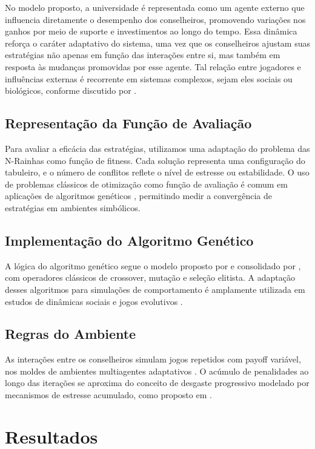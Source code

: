 \documentclass[
	article,			%
	11pt,				%
	oneside,			%
	a4paper,			%
	english,			%
	brazil,				%
	sumario=tradicional
	]{abntex2}
\begin{document}
No modelo proposto, a universidade é representada como um agente externo que influencia diretamente o desempenho dos conselheiros, promovendo variações nos ganhos por meio de suporte e investimentos ao longo do tempo. Essa dinâmica reforça o caráter adaptativo do sistema, uma vez que os conselheiros ajustam suas estratégias não apenas em função das interações entre si, mas também em resposta às mudanças promovidas por esse agente. Tal relação entre jogadores e influências externas é recorrente em sistemas complexos, sejam eles sociais ou biológicos, conforme discutido por .

\subsection{Representação da Função de Avaliação}
Para avaliar a eficácia das estratégias, utilizamos uma adaptação do problema das N-Rainhas como função de fitness. Cada solução representa uma configuração do tabuleiro, e o número de conflitos reflete o nível de estresse ou estabilidade. O uso de problemas clássicos de otimização como função de avaliação é comum em aplicações de algoritmos genéticos \cite{mitchell1998genetic}, permitindo medir a convergência de estratégias em ambientes simbólicos.

\subsection{Implementação do Algoritmo Genético}
A lógica do algoritmo genético segue o modelo proposto por  e consolidado por , com operadores clássicos de crossover, mutação e seleção elitista. A adaptação desses algoritmos para simulações de comportamento é amplamente utilizada em estudos de dinâmicas sociais e jogos evolutivos \cite{axelrod1987strategies, nowak2006evolutionary}.

\subsection{Regras do Ambiente}
As interações entre os conselheiros simulam jogos repetidos com payoff variável, nos moldes de ambientes multiagentes adaptativos \cite{tesfatsion2002agent}. O acúmulo de penalidades ao longo das iterações se aproxima do conceito de desgaste progressivo modelado por mecanismos de estresse acumulado, como proposto em \cite{leiter2005banishing}.


\section{Resultados}
\end{document}
